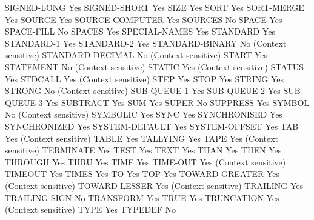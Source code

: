 SIGNED-LONG                     Yes
SIGNED-SHORT                    Yes
SIZE                            Yes
SORT                            Yes
SORT-MERGE                      Yes
SOURCE                          Yes
SOURCE-COMPUTER                 Yes
SOURCES                         No
SPACE                           Yes
SPACE-FILL                      No
SPACES                          Yes
SPECIAL-NAMES                   Yes
STANDARD                        Yes
STANDARD-1                      Yes
STANDARD-2                      Yes
STANDARD-BINARY                 No (Context sensitive)
STANDARD-DECIMAL                No (Context sensitive)
START                           Yes
STATEMENT                       No (Context sensitive)
STATIC                          Yes (Context sensitive)
STATUS                          Yes
STDCALL                         Yes (Context sensitive)
STEP                            Yes
STOP                            Yes
STRING                          Yes
STRONG                          No (Context sensitive)
SUB-QUEUE-1                     Yes
SUB-QUEUE-2                     Yes
SUB-QUEUE-3                     Yes
SUBTRACT                        Yes
SUM                             Yes
SUPER                           No
SUPPRESS                        Yes
SYMBOL                          No (Context sensitive)
SYMBOLIC                        Yes
SYNC                            Yes
SYNCHRONISED                    Yes
SYNCHRONIZED                    Yes
SYSTEM-DEFAULT                  Yes
SYSTEM-OFFSET                   Yes
TAB                             Yes (Context sensitive)
TABLE                           Yes
TALLYING                        Yes
TAPE                            Yes (Context sensitive)
TERMINATE                       Yes
TEST                            Yes
TEXT                            Yes
THAN                            Yes
THEN                            Yes
THROUGH                         Yes
THRU                            Yes
TIME                            Yes
TIME-OUT                        Yes (Context sensitive)
TIMEOUT                         Yes
TIMES                           Yes
TO                              Yes
TOP                             Yes
TOWARD-GREATER                  Yes (Context sensitive)
TOWARD-LESSER                   Yes (Context sensitive)
TRAILING                        Yes
TRAILING-SIGN                   No
TRANSFORM                       Yes
TRUE                            Yes
TRUNCATION                      Yes (Context sensitive)
TYPE                            Yes
TYPEDEF                         No
